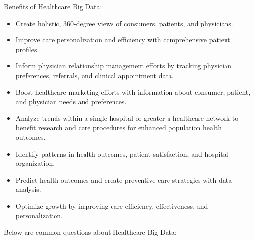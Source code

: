\documentclass[]{book}
\providecommand{\tightlist}{%
  \setlength{\itemsep}{0pt}\setlength{\parskip}{0pt}}
\begin{document}
Benefits of Healthcare Big Data:

\begin{itemize}
\tightlist
\item
  Create holistic, 360-degree views of consumers, patients, and
  physicians.
\item
  Improve care personalization and efficiency with comprehensive patient
  profiles.
\item
  Inform physician relationship management efforts by tracking physician
  preferences, referrals, and clinical appointment data.
\item
  Boost healthcare marketing efforts with information about consumer,
  patient, and physician needs and preferences.
\item
  Analyze trends within a single hospital or greater a healthcare
  network to benefit research and care procedures for enhanced
  population health outcomes.
\item
  Identify patterns in health outcomes, patient satisfaction, and
  hospital organization.
\item
  Predict health outcomes and create preventive care strategies with
  data analysis.
\item
  Optimize growth by improving care efficiency, effectiveness, and
  personalization.
\end{itemize}

Below are common questions about Healthcare Big Data:
\end{document}
